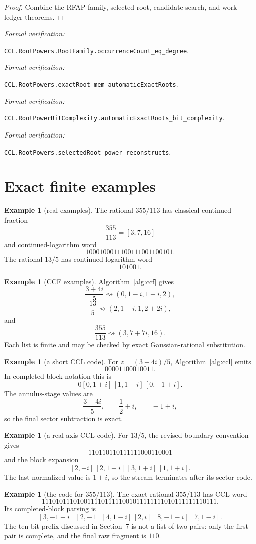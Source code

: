 \documentclass[10pt]{article}
\theoremstyle{definition}
\newtheorem{example}[theorem]{Example}
\theoremstyle{remark}
\newcommand{\leanref}[1]{\par\smallskip\noindent
  \emph{Formal verification:}\par\nobreak
  {\raggedright\nolinkurl{#1}.\par}}
\begin{document}
\begin{proof}
Combine the RFAP-family, selected-root, candidate-search, and work-ledger
theorems.
\end{proof}

\leanref{CCL.RootPowers.RootFamily.occurrenceCount_eq_degree}
\leanref{CCL.RootPowers.exactRoot_mem_automaticExactRoots}
\leanref{CCL.RootPowerBitComplexity.automaticExactRoots_bit_complexity}
\leanref{CCL.RootPowers.selectedRoot_power_reconstructs}

\fi

\ifCCLone
\section{Exact finite examples}

\begin{example}[real examples]
The rational $355/113$ has classical continued fraction
\[
 \frac{355}{113}=[3;7,16]
\]
and continued-logarithm word
\[
 1000100011100111001100101.
\]
The rational $13/5$ has continued-logarithm word
\[
 101001.
\]
\end{example}

\begin{example}[CCF examples]
Algorithm~\ref{alg:ccf} gives
\[
 \frac{3+4i}{5}\rightsquigarrow(0,1-i,1-i,2),
\]
\[
 \frac{13}{5}\rightsquigarrow(2,1+i,1,2+2i),
\]
and
\[
 \frac{355}{113}\rightsquigarrow(3,7+7i,16).
\]
Each list is finite and may be checked by exact Gaussian-rational substitution.
\end{example}

\begin{example}[a short CCL code]
For $z=(3+4i)/5$, Algorithm~\ref{alg:ccl} emits
\[
 00001100010011.
\]
In completed-block notation this is
\[
 0[0,1+i]\,[1,1+i]\,[0,-1+i].
\]
The annulus-stage values are
\[
 \frac{3+4i}{5},\qquad \frac12+i,\qquad -1+i,
\]
so the final sector subtraction is exact.
\end{example}

\begin{example}[a real-axis CCL code]
For $13/5$, the revised boundary convention gives
\[
 110110110111111000110001
\]
and the block expansion
\[
 [2,-i]\,[2,1-i]\,[3,1+i]\,[1,1+i].
\]
The last normalized value is $1+i$, so the stream terminates after its sector code.
\end{example}

\begin{example}[the code for $355/113$]\label{ex:ccl-355}
The exact rational $355/113$ has CCL word
\[
 11101011101001111011111001011111111010111111110111.
\]
Its completed-block parsing is
\[
 [3,-1-i]\,[2,-1]\,[4,1-i]\,[2,i]\,[8,-1-i]\,[7,1-i].
\]
The ten-bit prefix discussed in Section~7 is not a list of two pairs: only the first pair is complete, and the final raw fragment is $110$.
\end{example}
\end{document}
